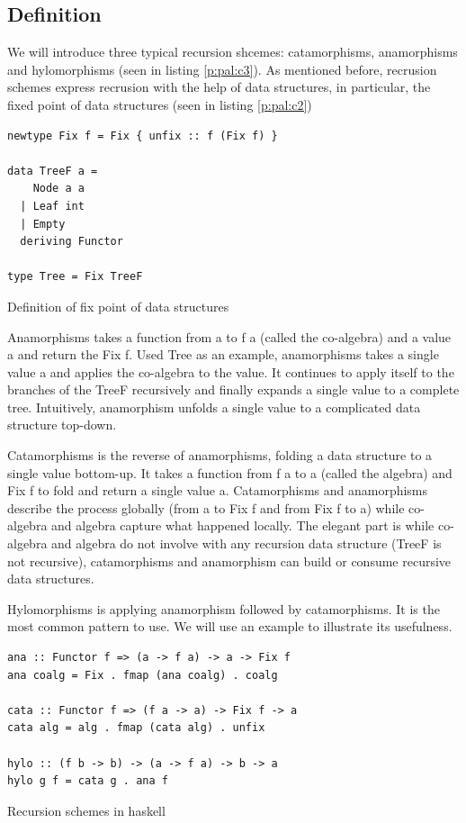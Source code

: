 \subsection{Definition}
We will introduce three typical recursion shcemes: catamorphisms, anamorphisms and hylomorphisms (seen in listing \ref{p:pal:c3}). As mentioned before, recrusion schemes express recrusion with the help of data structures, in particular, the fixed point of data structures (seen in listing \ref{p:pal:c2})
\begin{code}
\begin{verbatim}
newtype Fix f = Fix { unfix :: f (Fix f) }

data TreeF a =
    Node a a
  | Leaf int
  | Empty
  deriving Functor

type Tree = Fix TreeF
\end{verbatim}
\caption{Definition of fix point of data structures} \label{p:pal:c2}
\end{code}

Anamorphisms takes a function from a to f a (called the co-algebra) and a value a and return the Fix f. Used Tree as an example, anamorphisms takes a single value a and applies the co-algebra to the value. It continues to apply itself to the branches of the TreeF recursively and finally expands a single value to a complete tree. Intuitively, anamorphism unfolds a single value to a complicated data structure top-down.

Catamorphisms is the reverse of anamorphisms, folding a data structure to a single value bottom-up. It takes a function from f a to a (called the algebra) and Fix f to fold and return a single value a. Catamorphisms and anamorphisms describe the process globally (from a to Fix f and from Fix f to a) while co-algebra and algebra capture what happened locally. The elegant part is while co-algebra and algebra do not involve with any recursion data structure (TreeF is not recursive), catamorphisms and anamorphism can build or consume recursive data structures.

Hylomorphisms is applying anamorphism followed by catamorphisms. It is the most common pattern to use. We will use an example to illustrate its usefulness. 
\begin{code}
\begin{verbatim}
ana :: Functor f => (a -> f a) -> a -> Fix f
ana coalg = Fix . fmap (ana coalg) . coalg

cata :: Functor f => (f a -> a) -> Fix f -> a
cata alg = alg . fmap (cata alg) . unfix

hylo :: (f b -> b) -> (a -> f a) -> b -> a 
hylo g f = cata g . ana f 
\end{verbatim}
\caption{Recursion schemes in haskell} \label{p:pal:c3}
\end{code}

